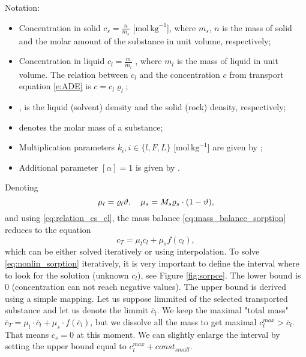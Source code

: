 Notation:
\begin{itemize}
 \item Concentration in solid $c_s = \frac{n}{m_s}$ [mol\,$\mathrm{kg}^{-1}$], where $m_s$, $n$ is the 
       mass of solid and the molar amount of the substance in unit volume, respectively;
 \item Concentration in liquid $c_l = \frac{m}{m_l}$ \units{}{}{}, where $m_l$ is 
       the mass of liquid in unit volume. The relation between $c_l$ and the concentration $c$ from 
       transport equation \eqref{e:ADE} is $c = c_l \varrho_l$;
 \item {},  is the liquid (solvent) density and the solid (rock) density, respectively;
 \item {} denotes the molar mass of a substance;
 \item Multiplication parameters $k_i, i\in\{ l,F,L\}$ [mol\,$\mathrm{kg}^{-1}$] are given by 
       ;
 \item Additional parameter $[\alpha] = 1$ is given by .
\end{itemize}

Denoting
\[ \mu_l = \varrho_l \vartheta, \quad \mu_s = M_s \varrho_s\cdot(1-\vartheta), \]
and using \eqref{eq:relation_cs_cl}, the mass balance \eqref{eq:mass_balance_sorption} reduces to the equation
\begin{equation}
 c_T = \mu_l c_l + \mu_s f(c_l),
 \label{eq:nonlin_sorption}
\end{equation}
which can be either solved iteratively or using interpolation.
To solve \eqref{eq:nonlin_sorption} iteratively, it is very important to define the interval where 
to look for the solution (unknown $c_l$), see Figure \ref{fig:sorpce}. The lower bound is $0$ (concentration can not reach negative values). 
The upper bound is derived using a simple mapping. Let us suppose limmited 
 of the selected transported substance and let us denote the 
limmit $\bar{c}_l$. We keep the maximal "total mass" 
$\bar{c}_T= \mu_l\cdot \bar{c}_l + \mu_s\cdot f(\bar{c}_l)$, but we dissolve all the mass to get 
maximal $c_l^{max} > \bar{c}_l$. That means $c_s = 0$ at this moment. We can slightly enlarge the interval by setting the upper bound equal to 
$c_l^{max} + const_{small}$.

